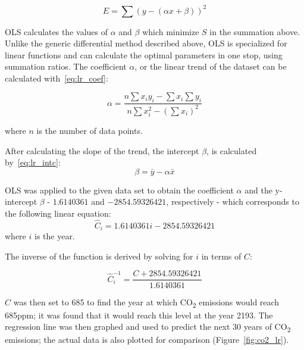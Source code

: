 \documentclass[12pt]{mcmthesis}
\begin{document}
    \begin{equation}
        E = \sum{(y - (\alpha x + \beta))^2}
        \label{eq:ls_lr}
    \end{equation}

    OLS calculates the values of $\alpha$ and $\beta$ which minimize $S$ in the summation above.
    Unlike the generic differential method described above, OLS is specialized for linear functions and can calculate the optimal parameters in one stop, using summation ratios.
    The coefficient $\alpha$, or the linear trend of the dataset can be calculated with~\eqref{eq:lr_coef}:

    \begin{equation}
        \alpha = \frac{n \sum x_i y_i - \sum x_i \sum y_i }{n \sum x^2_i - (\sum x_i)^2}
        \label{eq:lr_coef}
    \end{equation}

    \noindent where $n$ is the number of data points.

    After calculating the slope of the trend, the intercept $\beta$, is calculated by~\eqref{eq:lr_intc}:
%
    \begin{equation}
        \beta = \bar y - \alpha \bar x
        \label{eq:lr_intc}
    \end{equation}

    OLS was applied to the given data set to obtain the coefficient $\alpha$ and the y-intercept $\beta$ - $1.6140361$ and $-2854.59326421$, respectively - which corresponds to the following linear equation:
%
    \begin{equation}
        \hat C_i = 1.6140361 i - 2854.59326421
        \label{eq:co2_lr}
    \end{equation}
%
    \noindent where $i$ is the year.

    The inverse of the function is derived by solving for $i$ in terms of $C$:

    \begin{equation}
        \hat C^{-1}_i = \frac{C + 2854.59326421}{1.6140361}
        \label{eq:co2_lr_inv}
    \end{equation}

    $C$ was then set to 685 to find the year at which CO\textsubscript{2} emissions would reach 685ppm; it was found that it would reach this level at the year 2193.
    The regression line was then graphed and used to predict the next 30 years of CO\textsubscript{2} emissions; the actual data is also plotted for comparison (Figure~\ref{fig:co2_lr}).
\end{document}
